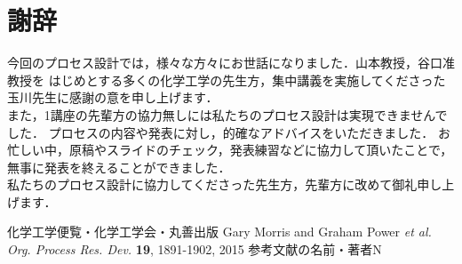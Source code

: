 \documentclass[a4j]{jsreport}
\begin{document}
\newpage
\chapter*{謝辞}
今回のプロセス設計では，様々な方々にお世話になりました．山本教授，谷口准教授を
はじめとする多くの化学工学の先生方，集中講義を実施してくださった玉川先生に感謝の意を申し上げます．\\
また，1講座の先輩方の協力無しには私たちのプロセス設計は実現できませんでした．
プロセスの内容や発表に対し，的確なアドバイスをいただきました．
お忙しい中，原稿やスライドのチェック，発表練習などに協力して頂いたことで，無事に発表を終えることができました．\\
私たちのプロセス設計に協力してくださった先生方，先輩方に改めて御礼申し上げます．

\newpage
\begin{thebibliography}{10}
     化学工学便覧・化学工学会・丸善出版
     Gary Morris and  Graham Power {\it et al.  Org. Process Res. Dev.} {\bf 19}, 1891-1902, 2015
     参考文献の名前・著者N
\end{thebibliography}

\newpage
\end{document}
